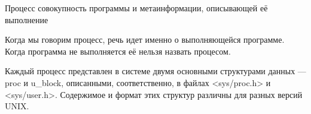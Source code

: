 \begin{defi}{Процесс}
	совокупность программы и метаинформации, описывающей её выполнение
\end{defi}

Когда мы говорим процесс, речь идет именно о выполняющейся программе. Когда программа не выполняется её нельзя назвать процесом.

Каждый процесс представлен в системе двумя основными структурами данных — proc и u\_block, описанными, соответственно, в файлах <sys/proc.h> и <sys/user.h>. Содержимое и формат этих структур различны для разных версий UNIX.